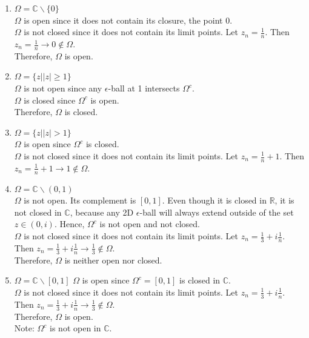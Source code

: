 \documentclass[11pt]{article}
\begin{document}
\begin{enumerate}
  \item $\Omega = \mathbb{C} \backslash \{0\}$ \\
  $\Omega$ is open since it does not contain its closure, the point 0. \\
  $\Omega$ is not closed since it does not contain its limit points. Let $z_n = \frac{1}{n}$. Then $z_n = \frac{1}{n} \to 0 \notin \Omega$. \\
  Therefore, $\Omega$ is open. 
  \item $\Omega = \{z||z| \geqslant 1\}$ \\
  $\Omega$ is not open since any $\epsilon$-ball at 1 intersects $\Omega^c$. \\
  $\Omega$ is closed since $\Omega^c$ is open. \\
  Therefore, $\Omega$ is closed. 
  \item $\Omega = \{z||z| > 1\}$ \\
  $\Omega$ is open since $\Omega^c$ is closed. \\
  $\Omega$ is not closed since it does not contain its limit points. Let $z_n = \frac{1}{n} + 1$. Then $z_n = \frac{1}{n} + 1 \to 1 \notin \Omega$.
  \item $\Omega = \mathbb{C} \backslash (0, 1)$ \\ 
  $\Omega$ is not open. Its complement is $[0, 1]$. Even though it is closed in $\mathbb{R}$, it is not closed in $\mathbb{C}$, because any 2D $\epsilon$-ball will always extend outside of the set $z \in (0, i)$. Hence, $\Omega^c$ is not open and not closed. \\
  $\Omega$ is not closed since it does not contain its limit points. Let $z_n = \frac{1}{3} + i\frac{1}{n}$. Then $z_n = \frac{1}{3} + i\frac{1}{n} \to \frac{1}{3} \notin \Omega$. \\
  Therefore, $\Omega$ is neither open nor closed. 
  \item $\Omega = \mathbb{C} \backslash [0, 1]$
  $\Omega$ is open since $\Omega^c = [0, 1]$ is closed in $\mathbb{C}$. \\ 
  $\Omega$ is not closed since it does not contain its limit points. Let $z_n = \frac{1}{3} + i\frac{1}{n}$. Then $z_n = \frac{1}{3} + i\frac{1}{n} \to \frac{1}{3} \notin \Omega$. \\
  Therefore, $\Omega$ is open. \\ 
  Note: $\Omega^c$ is not open in $\mathbb{C}$. 
\end{enumerate}


\newpage
\end{document}
